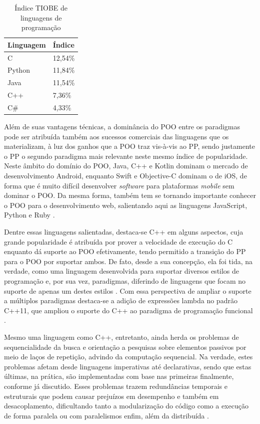 \begin{table}[!htb]
  \centering
  \caption{Índice TIOBE de linguagens de programação}
  \smallskip
  \begin{tabularx}{0.3\textwidth}{|X|l|}
    \hline
    Linguagem & Índice  \\
    \hline
    C         & 12,54\% \\
    \hline
    Python    & 11,84\% \\
    \hline
    Java      & 11,54\% \\
    \hline
    C++       & 7,36\%  \\
    \hline
    C\#       & 4,33\%  \\
    \hline
  \end{tabularx}
  \label{tab:linguagens}

\end{table}

Além de suas vantagens técnicas, a dominância do POO entre os paradigmas pode
ser atribuída também aos sucessos comerciais das linguagens que os materializam,
à luz dos ganhos que a POO traz vis-à-vis ao PP, sendo justamente o PP o segundo
paradigma mais relevante neste mesmo índice de popularidade. Neste âmbito  do
domínio do POO, Java, C++ e Kotlin dominam o mercado de desenvolvimento Android,
enquanto Swift e Objective-C dominam o de iOS, de forma que é muito difícil
desenvolver \textit{software} para plataformas \textit{mobile} sem dominar o
POO. Da mesma forma, também tem se tornando importante conhecer o POO para o
desenvolvimento web, salientando aqui as linguagens JavaScript, Python e Ruby
\cite{gwosdz_2020}.

Dentre essas linguagens salientadas, destaca-se C++ em alguns aspectos, cuja
grande popularidade é atribuída por prover a velocidade de execução do C
enquanto dá suporte ao POO efetivamente, tendo permitido a transição do
PP para o POO por suportar ambos. De fato, desde a sua concepção, ela foi tida,
na verdade, como uma linguagem desenvolvida para suportar diversos estilos de
programação e, por sua vez, paradigmas, diferindo de linguagens que focam no
suporte de apenas um destes estilos \cite{bjarne_1995}. Com essa perspectiva de
ampliar o suporte a múltiplos paradigmas destaca-se a adição de expressões
lambda no padrão C++11, que ampliou o suporte do C++ ao paradigma de programação
funcional \cite{bjarne_2020}.

Mesmo uma linguagem como C++, entretanto, ainda herda os problemas de
sequencialidade da busca e orientação a pesquisas sobre elementos passivos por
meio de laços de repetição, advindo da computação sequencial. Na verdade, estes
problemas afetam desde linguagens imperativas até declarativas, sendo que estas
últimas, na prática, são implementadas com base nas primeiras finalmente,
conforme já discutido. Esses problemas trazem redundâncias temporais e
estruturais que podem causar prejuízos em desempenho e também em desacoplamento,
dificultando tanto a modularização do código como a execução de forma paralela
ou com paralelismos enfim, além da distribuída
\cite{simao_2009,simao_2012a,doc_ronszcka_2019}.


